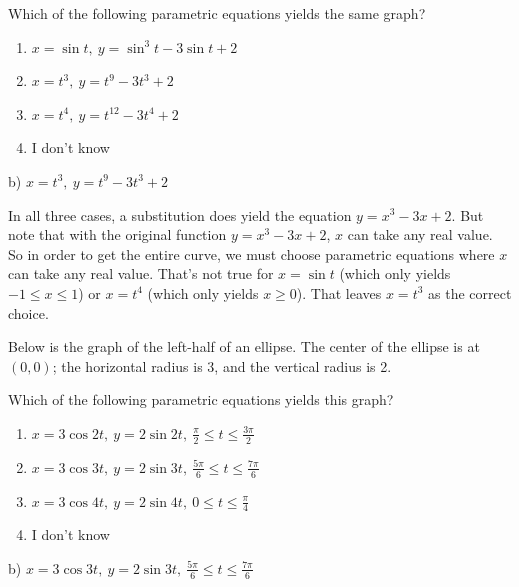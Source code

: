 \documentclass[addpoints,12pt,answers]{exam}
\begin{document}
\begin{questions}
\begin{center}
  \end{center}
  Which of the following parametric equations yields the same graph?
  \begin{enumerate}[label=\alph*)]
    \item
    $x=\sin t, \ y=\sin^3 t-3\sin t+2$
    \item
    $x=t^3, \ y=t^9-3t^3+2$
    \item
    $x=t^4, \ y=t^{12}-3t^4+2$
    \item
    I don't know
  \end{enumerate}
  \begin{solution}
    b) $x=t^3, \ y=t^9-3t^3+2$
    
    In all three cases, a substitution does yield the equation $y=x^3-3x+2$. But note that with the original function $y=x^3-3x+2$, $x$ can take any real value. So in order to get the entire curve, we must choose parametric equations where $x$ can take any real value. That's not true for $x=\sin t$ (which only yields $-1\le x\le 1$) or $x=t^4$ (which only yields $x\ge 0$). That leaves $x=t^3$ as the correct choice.
  \end{solution}
  \newpage
  \question
  Below is the graph of the left-half of an ellipse. The center of the ellipse is at $(0,0)$; the horizontal radius is 3, and the vertical radius is 2.
  \begin{center}
  \end{center}
  Which of the following parametric equations yields this graph?
  \begin{enumerate}[label=\alph*)]
    \item
    $\displaystyle x=3\cos 2t, \ y=2\sin 2t, \ \frac{\pi}{2}\le t\le\frac{3\pi}{2}$
    \item
    $\displaystyle x=3\cos 3t, \ y=2\sin 3t, \ \frac{5\pi}{6}\le t\le\frac{7\pi}{6}$
    \item
    $\displaystyle x=3\cos 4t, \ y=2\sin 4t, \ 0\le t\le\frac{\pi}{4}$
    \item
    I don't know
  \end{enumerate}
  \begin{solution}
    b) $\displaystyle x=3\cos 3t, \ y=2\sin 3t, \ \frac{5\pi}{6}\le t\le\frac{7\pi}{6}$
    

\end{solution}
\end{questions}
\end{document}
